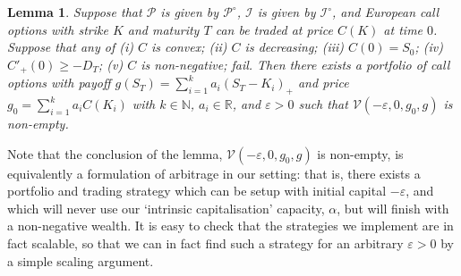 \documentclass[a4paper]{amsart}
\newtheorem{lemma}[theorem]{Lemma}
\theoremstyle{definition}
\theoremstyle{remark}
\numberwithin{equation}{section}
\newcommand{\R}{\mathbb{R}}
\newcommand{\eps}{\varepsilon}
\newcommand{\Nb}{\mathbb{N}}
\newcommand{\Pc}{\mathcal{P}}
\newcommand{\Vc}{\mathcal{V}}
\newcommand{\In}{\mathcal{I}} %
\begin{document}
\begin{lemma}
  Suppose that $\Pc$ is given by $\Pc^\circ$, $\In$ is given by $\In^\circ$, and European call options with strike $K$ and maturity $T$ can be traded at price $C(K)$ at time $0$. Suppose that any of \emph{(i)} $C$ is convex; \emph{(ii)} $C$ is decreasing; \emph{(iii)} $C(0) = S_0$; \emph{(iv)} $C'_+(0) \ge -D_T$; \emph{(v)} $C$ is non-negative; fail.  Then there exists a portfolio of call options with payoff $g(S_T) = \sum_{i=1}^k a_i (S_T-K_i)_+$ and price $g_0 = \sum_{i=1}^k a_i C(K_i)$ with $k \in \Nb$, $a_i \in \R$, and $\eps>0$ such that $\Vc(-\eps,0,g_0,g)$ is non-empty.
\end{lemma}

Note that the conclusion of the lemma, $\Vc(-\eps,0,g_0,g)$ is non-empty, is equivalently a formulation of arbitrage in our setting: that is, there exists a portfolio and trading strategy which can be setup with initial capital $-\eps$, and which will never use our `intrinsic capitalisation' capacity, $\alpha$, but will finish with a non-negative wealth. It is easy to check that the strategies we implement are in fact scalable, so that we can in fact find such a strategy for an arbitrary $\eps >0$ by a simple scaling argument.
\end{document}
